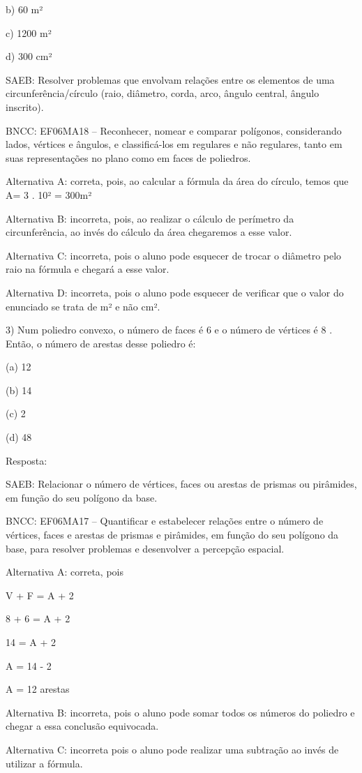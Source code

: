 b) 60 m²

c) 1200 m²

d) 300 cm²

SAEB: Resolver problemas que envolvam relações entre os elementos de uma
circunferência/círculo (raio, diâmetro, corda, arco, ângulo central,
ângulo inscrito).

BNCC: EF06MA18 -- Reconhecer, nomear e comparar polígonos, considerando
lados, vértices e ângulos, e classificá-los em regulares e não
regulares, tanto em suas representações no plano como em faces de
poliedros.

Alternativa A: correta, pois, ao calcular a fórmula da área do círculo,
temos que A= 3 . 10² = 300m²

Alternativa B: incorreta, pois, ao realizar o cálculo de perímetro da
circunferência, ao invés do cálculo da área chegaremos a esse valor.

Alternativa C: incorreta, pois o aluno pode esquecer de trocar o
diâmetro pelo raio na fórmula e chegará a esse valor.

Alternativa D: incorreta, pois o aluno pode esquecer de verificar que o
valor do enunciado se trata de m² e não cm².

3) Num poliedro convexo, o número de faces é 6 e o número de vértices é
8 . Então, o número de arestas desse poliedro é:

(a) 12

(b) 14

(c) 2

(d) 48

Resposta:

SAEB: Relacionar o número de vértices, faces ou arestas de prismas ou
pirâmides, em função do seu polígono da base.

BNCC: EF06MA17 -- Quantificar e estabelecer relações entre o número de
vértices, faces e arestas de prismas e pirâmides, em função do seu
polígono da base, para resolver problemas e desenvolver a percepção
espacial.

Alternativa A: correta, pois

V + F = A + 2

8 + 6 = A + 2

14 = A + 2

A = 14 - 2

A = 12 arestas

Alternativa B: incorreta, pois o aluno pode somar todos os números do
poliedro e chegar a essa conclusão equivocada.

Alternativa C: incorreta pois o aluno pode realizar uma subtração ao
invés de utilizar a fórmula.

